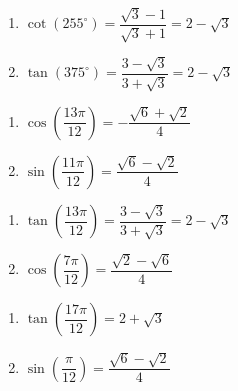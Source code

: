 \begin{multicols}{2}

\begin{enumerate}

\setcounter{enumi}{\value{HW}}

\item  $\cot(255^{\circ}) = \dfrac{\sqrt{3}-1}{\sqrt{3}+1} = 2-\sqrt{3}$
\item  $\tan(375^{\circ}) = \dfrac{3-\sqrt{3}}{3+\sqrt{3}} = 2-\sqrt{3}$

\setcounter{HW}{\value{enumi}}

\end{enumerate}

\end{multicols}

\begin{multicols}{2}

\begin{enumerate}

\setcounter{enumi}{\value{HW}}

\item  $\cos\left(\dfrac{13\pi}{12}\right) = -\dfrac{\sqrt{6}+\sqrt{2}}{4}$
\item  $\sin\left(\dfrac{11\pi}{12}\right) = \dfrac{\sqrt{6} - \sqrt{2}}{4}$

\setcounter{HW}{\value{enumi}}

\end{enumerate}

\end{multicols}

\begin{multicols}{2}

\begin{enumerate}

\setcounter{enumi}{\value{HW}}

\item  $\tan\left(\dfrac{13\pi}{12}\right) = \dfrac{3-\sqrt{3}}{3+\sqrt{3}} = 2-\sqrt{3}$
\item $\cos \left( \dfrac{7\pi}{12} \right) = \dfrac{\sqrt{2} - \sqrt{6}}{4}$

\setcounter{HW}{\value{enumi}}

\end{enumerate}

\end{multicols}

\begin{multicols}{2}

\begin{enumerate}

\setcounter{enumi}{\value{HW}}

\item $\tan \left( \dfrac{17\pi}{12} \right) = 2 + \sqrt{3}$
\item $\sin \left( \dfrac{\pi}{12} \right) = \dfrac{\sqrt{6} - \sqrt{2}}{4}$

\setcounter{HW}{\value{enumi}}

\end{enumerate}

\end{multicols}

